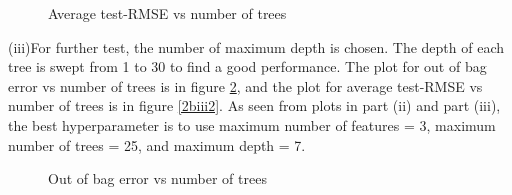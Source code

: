 \documentclass{article}
\begin{document}
\begin{figure}[!htbp]
\centering
{}
\caption{Average test-RMSE vs number of trees} \label{2bii2}
\end{figure}

(iii)For further test, the number of maximum depth is chosen. The depth of each tree is swept from 1 to 30 to find a good performance. The plot for out of bag error vs number of trees is in figure \ref{2biii1}, and the plot for average test-RMSE vs number of trees is in figure \ref{2biii2}. As seen from plots in part (ii) and part (iii), the best hyperparameter is to use maximum number of features = 3, maximum number of trees = 25, and maximum depth = 7.\\

\begin{figure}[!htbp]
\centering
{}
\caption{Out of bag error vs number of trees} \label{2biii1}
\end{figure}
\end{document}
